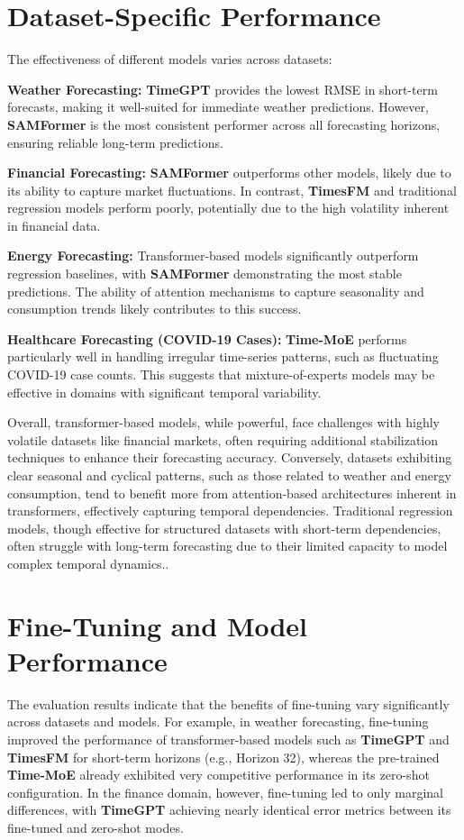 \section{Dataset-Specific Performance}
The effectiveness of different models varies across datasets:

\textbf{Weather Forecasting:} \textbf{TimeGPT} provides the lowest RMSE in short-term forecasts, making it well-suited for immediate weather predictions. However, \textbf{SAMFormer} is the most consistent performer across all forecasting horizons, ensuring reliable long-term predictions.

\textbf{Financial Forecasting:} \textbf{SAMFormer} outperforms other models, likely due to its ability to capture market fluctuations. In contrast, \textbf{TimesFM} and traditional regression models perform poorly, potentially due to the high volatility inherent in financial data.

\textbf{Energy Forecasting:} Transformer-based models significantly outperform regression baselines, with \textbf{SAMFormer} demonstrating the most stable predictions. The ability of attention mechanisms to capture seasonality and consumption trends likely contributes to this success.

\textbf{Healthcare Forecasting (COVID-19 Cases):} \textbf{Time-MoE} performs particularly well in handling irregular time-series patterns, such as fluctuating COVID-19 case counts. This suggests that mixture-of-experts models may be effective in domains with significant temporal variability.

Overall, transformer-based models, while powerful, face challenges with highly volatile datasets like financial markets, often requiring additional stabilization techniques to enhance their forecasting accuracy. Conversely, datasets exhibiting clear seasonal and cyclical patterns, such as those related to weather and energy consumption, tend to benefit more from attention-based architectures inherent in transformers, effectively capturing temporal dependencies. Traditional regression models, though effective for structured datasets with short-term dependencies, often struggle with long-term forecasting due to their limited capacity to model complex temporal dynamics..

\section{Fine-Tuning and Model Performance}

The evaluation results indicate that the benefits of fine-tuning vary significantly across datasets and models. For example, in weather forecasting, fine-tuning improved the performance of transformer-based models such as \textbf{TimeGPT} and \textbf{TimesFM} for short-term horizons (e.g., Horizon 32), whereas the pre-trained \textbf{Time-MoE} already exhibited very competitive performance in its zero-shot configuration. In the finance domain, however, fine-tuning led to only marginal differences, with \textbf{TimeGPT} achieving nearly identical error metrics between its fine-tuned and zero-shot modes.

